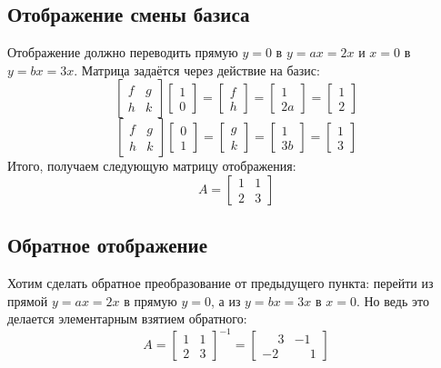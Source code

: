 \documentclass[a4paper,hidelinks,14pt]{extarticle}
\begin{document}
	\subsection{Отображение смены базиса}
	Отображение должно переводить прямую $y = 0$ в $y=ax=2x$ и $x=0$ в $y=bx=3x$. Матрица задаётся через действие на базис:
	$$
	\begin{bmatrix}
		f & g \\
		h & k
	\end{bmatrix}
	\begin{bmatrix}
		1 \\
		0
	\end{bmatrix}
	=
	\begin{bmatrix}
		f \\
		h
	\end{bmatrix}
	=
	\begin{bmatrix}
		1 \\
		2a
	\end{bmatrix}
	=
	\begin{bmatrix}
		1 \\
		2
	\end{bmatrix}
	$$
	$$
	\begin{bmatrix}
		f & g \\
		h & k
	\end{bmatrix}
	\begin{bmatrix}
		0 \\
		1
	\end{bmatrix}
	=
	\begin{bmatrix}
		g \\
		k
	\end{bmatrix}
	=
	\begin{bmatrix}
		1 \\
		3b
	\end{bmatrix}
	=
	\begin{bmatrix}
		1 \\
		3
	\end{bmatrix}
	$$
	Итого, получаем следующую матрицу отображения:
	$$
	A = \begin{bmatrix}
		1 & 1 \\
		2 & 3
	\end{bmatrix}
	$$
	
	\subsection{Обратное отображение}
	Хотим сделать обратное преобразование от предыдущего пункта: перейти из прямой $y=ax=2x$ в прямую $y=0$, а из $y=bx=3x$ в $x=0$. Но ведь это делается элементарным взятием обратного:
	$$
	A = 
	\begin{bmatrix}
		1 & 1 \\
		2 & 3
	\end{bmatrix}^{-1}
	=
	\begin{bmatrix}
		\phantom{-}3 & -1 \\
		-2 & \phantom{-}1
	\end{bmatrix}
	$$
\end{document}
